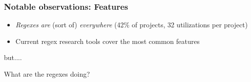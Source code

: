 %
%


\begin{frame}
\frametitle{Notable observations: Features}

\begin{block}{}
\begin{itemize}
	\item {\em Regexes are} (sort of) {\em everywhere} (42\% of projects, 32 utilizations per project)
	\item Current regex research tools cover the most common features
\end{itemize}
\end{block}

but....

\begin{block}{}
What are the regexes doing?
\end{block}


\end{frame}
